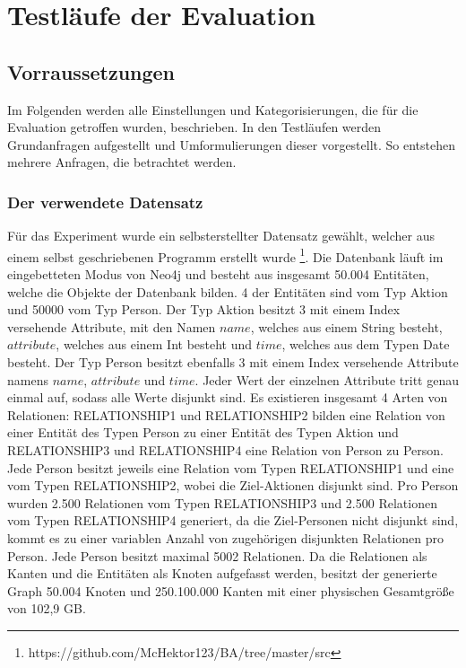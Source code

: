 
\chapter{Testläufe der Evaluation} %

\label{Kapitel3} %

\section{Vorraussetzungen}
Im Folgenden werden alle Einstellungen und Kategorisierungen, die für die Evaluation getroffen wurden, beschrieben. In den Testläufen werden Grundanfragen aufgestellt und Umformulierungen dieser vorgestellt. So entstehen mehrere Anfragen, die betrachtet werden.  
\subsection{Der verwendete Datensatz}
Für das Experiment wurde ein selbsterstellter Datensatz gewählt, welcher aus einem selbst geschriebenen Programm erstellt wurde \footnote{https://github.com/McHektor123/BA/tree/master/src}. Die Datenbank läuft im eingebetteten Modus von Neo4j und besteht aus insgesamt 50.004 Entitäten, welche die Objekte der Datenbank bilden. 4 der Entitäten sind  vom Typ Aktion und 50000 vom Typ Person. Der Typ Aktion besitzt 3 mit einem Index versehende Attribute, mit den Namen $name$, welches aus einem String besteht, $attribute$, welches aus einem Int besteht und $time$, welches aus dem Typen Date besteht. Der Typ Person besitzt ebenfalls 3 mit einem Index versehende Attribute namens $name$, $attribute$ und $time$. Jeder Wert der einzelnen Attribute tritt genau einmal auf, sodass alle Werte disjunkt sind. \newline
Es existieren insgesamt 4 Arten von Relationen: RELATIONSHIP1 und RELATIONSHIP2 bilden eine Relation von einer Entität des Typen Person zu einer Entität des Typen Aktion  und  RELATIONSHIP3 und RELATIONSHIP4 eine Relation von Person zu Person. Jede Person besitzt jeweils eine Relation vom Typen RELATIONSHIP1 und eine vom Typen RELATIONSHIP2, wobei die Ziel-Aktionen disjunkt sind. Pro Person wurden 2.500 Relationen vom Typen RELATIONSHIP3 und 2.500 Relationen vom Typen RELATIONSHIP4 generiert, da die Ziel-Personen nicht disjunkt sind, kommt es zu einer variablen Anzahl von zugehörigen disjunkten Relationen pro Person. Jede Person besitzt maximal 5002 Relationen. Da die Relationen als Kanten und die Entitäten als Knoten aufgefasst werden, besitzt der generierte Graph 50.004 Knoten und 250.100.000 Kanten mit einer physischen Gesamtgröße von 102,9 GB. 
